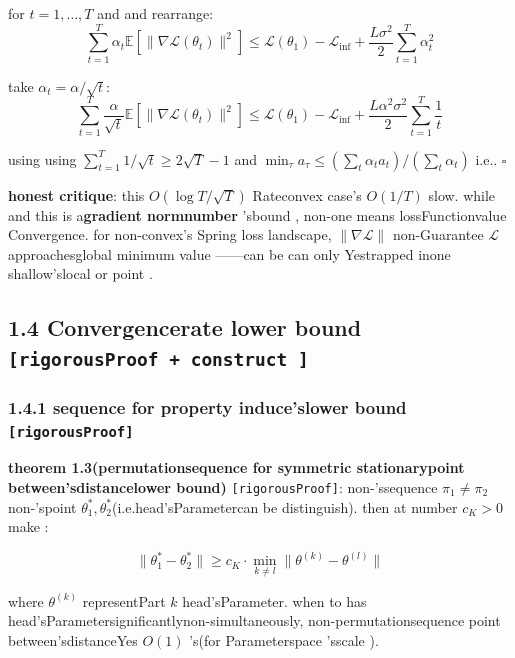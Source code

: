\documentclass[
  12pt,
]{article}
\begin{document}
for  \(t = 1, \ldots, T\) and and rearrange: 
\[\sum_{t=1}^{T} \alpha_t \mathbb{E}[\|\nabla\mathcal{L}(\theta_t)\|^2] \leq \mathcal{L}(\theta_1) - \mathcal{L}_{\inf} + \frac{L\sigma^2}{2}\sum_{t=1}^{T} \alpha_t^2\]

take \(\alpha_t = \alpha / \sqrt{t}\): 
\[\sum_{t=1}^{T} \frac{\alpha}{\sqrt{t}} \mathbb{E}[\|\nabla\mathcal{L}(\theta_t)\|^2] \leq \mathcal{L}(\theta_1) - \mathcal{L}_{\inf} + \frac{L\alpha^2\sigma^2}{2} \sum_{t=1}^{T} \frac{1}{t}\]

using using  \(\sum_{t=1}^{T} 1/\sqrt{t} \geq 2\sqrt{T} - 1\) and 
\(\min_{\tau} a_\tau \leq (\sum_t \alpha_t a_t) / (\sum_t \alpha_t)\)
i.e.. \(\square\)

\textbf{honest critique}: this  \(O(\log T / \sqrt{T})\) Rateconvex case's
\(O(1/T)\)
slow. while and this is a\textbf{gradient normnumber }'sbound , non-one means lossFunctionvalue Convergence. for non-convex's
Spring loss landscape, \(\|\nabla\mathcal{L}\|\) non-Guarantee \(\mathcal{L}\)
approachesglobal minimum value ------can be can only Yestrapped inone shallow'slocal or point . 

\subsection{\texorpdfstring{1.4 Convergencerate lower bound
\texttt{{[}rigorousProof\ +\ construct {]}}}{1.4 Convergencerate lower bound {[}rigorousProof + construct {]}}}\label{ux6536ux655bux7387ux4e0bux754c-ux4e25ux683cux8bc1ux660e-ux6784ux9020}

\subsubsection{\texorpdfstring{1.4.1 sequence for property induce'slower bound
\texttt{{[}rigorousProof{]}}}{1.4.1 sequence for property induce'slower bound {[}rigorousProof{]}}}\label{ux6392ux5217ux5bf9ux79f0ux6027ux5f15ux8d77ux7684ux4e0bux754c-ux4e25ux683cux8bc1ux660e}

\textbf{theorem  1.3(permutationsequence for symmetric stationarypoint between'sdistancelower bound)}
\texttt{{[}rigorousProof{]}}: non-'ssequence  \(\pi_1 \neq \pi_2\)
non-'spoint 
\(\theta_1^*, \theta_2^*\)(i.e.head'sParametercan be distinguish). then at number  \(c_K > 0\)
make : 

\[\boxed{\|\theta_1^* - \theta_2^*\| \geq c_K \cdot \min_{k \neq l} \|\theta^{(k)} - \theta^{(l)}\|}\]

where \(\theta^{(k)}\) representPart \(k\)
head'sParameter. when to has head'sParametersignificantlynon-simultaneously, non-permutationsequence point between'sdistanceYes
\(O(1)\) 's(for Parameterspace 'sscale ). 
\end{document}
